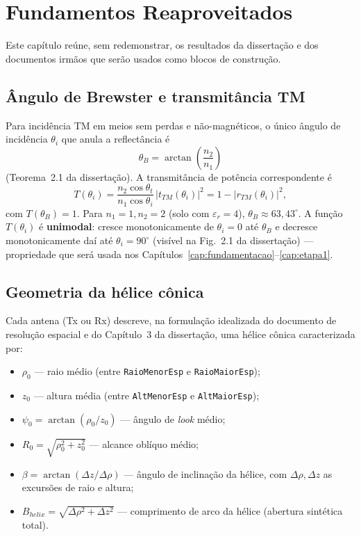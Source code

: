 \documentclass[12pt,a4paper,oneside]{book}
\theoremstyle{definition}
\theoremstyle{remark}
\newcommand{\thetaB}{\theta_B}
\newcommand{\nuno}{n_1}
\newcommand{\ndos}{n_2}
\begin{document}
\chapter{Fundamentos Reaproveitados}
\label{cap:fundamentos}

Este capítulo reúne, sem redemonstrar, os resultados da dissertação e dos
documentos irmãos que serão usados como blocos de construção.

\section{Ângulo de Brewster e transmitância TM}

Para incidência TM em meios sem perdas e não-magnéticos, o único ângulo de
incidência $\theta_i$ que anula a reflectância é
\begin{equation}
  \thetaB = \arctan\!\left(\frac{\ndos}{\nuno}\right)
  \label{eq:brewster}
\end{equation}
(Teorema~2.1 da dissertação). A transmitância de potência correspondente é
\begin{equation}
  T(\theta_i) = \frac{\ndos\cos\theta_t}{\nuno\cos\theta_i}\,|t_{TM}(\theta_i)|^2
  = 1-|r_{TM}(\theta_i)|^2,
  \label{eq:fresnel_T}
\end{equation}
com $T(\thetaB)=1$. Para $\nuno=1,\ndos=2$ (solo com $\varepsilon_r=4$),
$\thetaB\approx 63{,}43^\circ$. A função $T(\theta_i)$ é \textbf{unimodal}: cresce
monotonicamente de $\theta_i=0$ até $\thetaB$ e decresce monotonicamente daí
até $\theta_i=90^\circ$ (visível na Fig.~2.1 da dissertação) — propriedade que
será usada nos Capítulos~\ref{cap:fundamentacao}--\ref{cap:etapa1}.

\section{Geometria da hélice cônica}

Cada antena (Tx ou Rx) descreve, na formulação idealizada do documento
de resolução espacial e do Capítulo~3 da dissertação, uma hélice cônica
caracterizada por:
\begin{itemize}
  \item $\rho_0$ — raio médio (entre \texttt{RaioMenorEsp} e
  \texttt{RaioMaiorEsp});
  \item $z_0$ — altura média (entre \texttt{AltMenorEsp} e
  \texttt{AltMaiorEsp});
  \item $\psi_0=\arctan(\rho_0/z_0)$ — ângulo de \textit{look} médio;
  \item $R_0=\sqrt{\rho_0^2+z_0^2}$ — alcance oblíquo médio;
  \item $\beta=\arctan(\Delta z/\Delta\rho)$ — ângulo de inclinação da
  hélice, com $\Delta\rho,\Delta z$ as excursões de raio e altura;
  \item $B_{helix}=\sqrt{\Delta\rho^2+\Delta z^2}$ — comprimento de arco da
  hélice (abertura sintética total).
\end{itemize}
\end{document}
